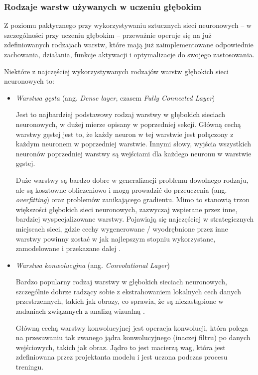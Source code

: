 \subsubsection{Rodzaje warstw używanych w uczeniu głębokim}

Z poziomu paktycznego przy wykorzystywaniu sztucznych sieci neuronowych -- w szczególności przy uczeniu głębokim -- przeważnie operuje się na już zdefiniowanych rodzajach warstw, które mają już zaimplementowane odpowiednie zachowania, działania, funkcje aktywacji i optymalizacje do swojego zastosowania.

Niektóre z najczęściej wykorzystywanych rodzajów warstw głębokich sieci neuronowych to:

\begin{itemize}

  \item \emph{Warstwa gęsta} (ang. \emph{Dense layer}, czasem \emph{Fully Connected Layer})

        Jest to najbardziej podstawowy rodzaj warstwy w głębokich sieciach neuronowych, w dużej mierze opisany w poprzedniej sekcji.
        Główną cechą warstwy gęstej jest to, że każdy neuron w tej warstwie jest połączony z każdym neuronem w poprzedniej warstwie.
        Innymi słowy, wyjścia wszystkich neuronów poprzedniej warstwy są wejściami dla każdego neuronu w warstwie gęstej.

        Duże warstwy są bardzo dobre w generalizacji problemu dowolnego rodzaju, ale są kosztowne obliczeniowo i mogą prowadzić do przeuczenia (ang. \emph{overfitting}) oraz problemów
        zanikającego gradientu.
        Mimo to stanowią trzon większości głębokich sieci neuronowych, zazwyczaj wspierane przez inne, bardziej wyspecjalizowane warstwy.
        Pojawiają się najczęściej w strategicznych miejscach sieci, gdzie cechy wygenerowane / wyodrębnione przez inne warstwy powinny zostać w jak najlepszym stopniu wykorzystane, zamodelowane i przekazane dalej \cite{josephine2021impact}.

  \item \emph{Warstwa konwolucyjna} (ang. \emph{Convolutional Layer})

        Bardzo popularny rodzaj warstwy w glębokich sieciach neuronowych, szczególnie dobrze radzący sobie z ekstrahowaniem lokalnych cech danych przestrzennych, takich jak obrazy, co sprawia, że są niezastąpione w zadaniach związanych z analizą wizualną \cite{albawi2017understanding}.

        Główną cechą warstwy konwolucyjnej jest operacja konwolucji, która polega na przesuwaniu tak zwanego jądra konwolucyjnego (inaczej filtru) po danych wejściowych, takich jak obraz.
        Jądro to jest macierzą wag, która jest zdefiniowana przez projektanta modelu i jest uczona podczas procesu treningu.


\end{itemize}
